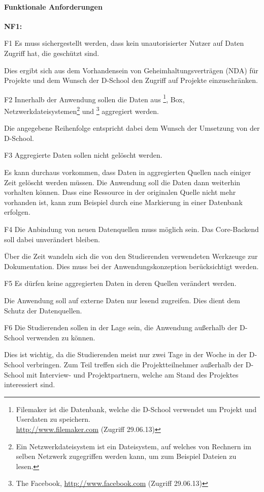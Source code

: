 \paragraph{Funktionale Anforderungen}
\label{sec:functional}
\begin{labeling}{\textbf{NF1:}}
  \item[F1\label{itm:f1}] Es muss sichergestellt werden, dass kein unautorisierter Nutzer auf Daten Zugriff hat, die geschützt sind.

  Dies ergibt sich aus dem Vorhandensein von Geheimhaltungsverträgen (NDA) für Projekte und dem Wunsch der D-School den Zugriff auf Projekte einzuschränken. 

  \item[F2\label{itm:f2}] Innerhalb der Anwendung sollen die Daten aus \footnote{Filemaker ist die Datenbank, welche die D-School verwendet um Projekt und Userdaten zu speichern.\\ \url{http://www.filemaker.com} (Zugriff 29.06.13)}, Box, Netzwerkdateisystemen\footnote{Ein Netzwerkdateisystem ist ein Dateisystem, auf welches von Rechnern im selben Netzwerk zugegriffen werden kann, um zum Beispiel Dateien zu lesen.} und \footnote{The Facebook, \url{http://www.facebook.com} (Zugriff 29.06.13)} aggregiert werden.

  Die angegebene Reihenfolge entspricht dabei dem Wunsch der Umsetzung von der D-School.
\\ %
  \item[F3\label{itm:f3}] Aggregierte Daten sollen nicht gelöscht werden. 

  Es kann durchaus vorkommen, dass Daten in aggregierten Quellen nach einiger Zeit gelöscht werden müssen. Die Anwendung soll die Daten dann weiterhin vorhalten können. Dass eine Ressource in der originalen Quelle nicht mehr vorhanden ist, kann zum Beispiel durch eine Markierung in einer Datenbank erfolgen.

  \item[F4\label{itm:f4}] Die Anbindung von neuen Datenquellen muss möglich sein. Das Core-Backend soll dabei unverändert bleiben.

  Über die Zeit wandeln sich die von den Studierenden verwendeten Werkzeuge zur Dokumentation. Dies muss bei der Anwendungskonzeption berücksichtigt werden.

  \item[F5\label{itm:f5}] Es dürfen keine aggregierten Daten in deren Quellen verändert werden.

  Die Anwendung soll auf externe Daten nur lesend zugreifen. Dies dient dem Schutz der Datenquellen.

  \item[F6\label{itm:f6}] Die Studierenden sollen in der Lage sein, die Anwendung außerhalb der D-School verwenden zu können. 

  Dies ist wichtig, da die Studierenden meist nur zwei Tage in der Woche in der D-School verbringen. Zum Teil treffen sich die Projektteilnehmer außerhalb der D-School mit Interview- und Projektpartnern, welche am Stand des Projektes interessiert sind. 
\end{labeling}

